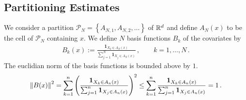 \subsection*{Partitioning Estimates}
We consider a partition
$
  \mathcal{P}_N
  =
  \left\{ 
    A_{N,1}
    ,
    A_{N,2}
    ,
    \ldots
  \right\}
$
of $ \mathbb{R}^d $
and define
$ A_N(x) $ to be the cell of $ \mathcal{P}_N $ containing $x$.
We define $N$ basis functions $B_k$ of the covariates by
\begin{gather*}
  B_k(x)
  :=
  \frac{
  \mathbf{1}_{X_k \in A_N(x)}
  }{
  \sum_{j=1}^{N} 
  \mathbf{1}_{X_j \in A_N(x)}
  }
  \,,
  \qquad
  k=
  1,\ldots,N
  \,.
\end{gather*}
The euclidian norm of the basis functions is bounded above by $1$.
\begin{gather*}
  \left\lVert B(x)\right\rVert^2
  =
  \sum_{k=1}^{n} 
  \left( 
  \frac{
  \mathbf{1}_{X_k \in A_n(x)}
  }{
  \sum_{j=1}^{n} 
  \mathbf{1}_{X_j \in A_n(x)}
  }
  \right)
  ^2
  \le
  \sum_{k=1}^{n} 
  \frac{
  \mathbf{1}_{X_k \in A_n(x)}
  }{
  \sum_{j=1}^{n} 
  \mathbf{1}_{X_j \in A_n(x)}
  }
  =1
  \,.
\end{gather*}
